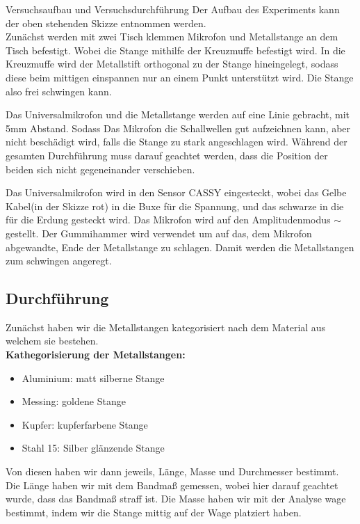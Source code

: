 \documentclass[twoside]{protokoll}
\begin{document}
\begin{aufgabe}{Versuchsaufbau und Versuchsdurchführung}
Der Aufbau des Experiments kann der oben stehenden Skizze entnommen werden. \\


Zunächst werden mit zwei Tisch klemmen Mikrofon und Metallstange an dem Tisch befestigt. Wobei die Stange mithilfe der Kreuzmuffe befestigt wird. In die Kreuzmuffe wird der Metallstift orthogonal zu der Stange hineingelegt, sodass diese beim mittigen einspannen nur an einem Punkt unterstützt wird. Die Stange also frei schwingen kann. 

Das Universalmikrofon und die Metallstange werden auf eine Linie gebracht, mit 5mm Abstand. Sodass Das Mikrofon die Schallwellen gut aufzeichnen kann, aber nicht beschädigt wird, falls die Stange zu stark angeschlagen wird. Während der gesamten Durchführung muss darauf geachtet werden, dass die Position der beiden sich nicht gegeneinander verschieben. 


Das Universalmikrofon wird in den Sensor CASSY eingesteckt, wobei das Gelbe Kabel(in der Skizze rot) in die Buxe für die Spannung, und das schwarze in die für die Erdung gesteckt wird. Das Mikrofon wird auf den Amplitudenmodus $\sim$ gestellt. Der Gummihammer wird verwendet um auf das, dem Mikrofon abgewandte, Ende der Metallstange zu schlagen. Damit werden die Metallstangen zum schwingen angeregt.

\subsection{Durchführung}

Zunächst haben wir die Metallstangen kategorisiert nach dem Material aus welchem sie bestehen.\\

\textbf{Kathegorisierung der Metallstangen:}

\begin{itemize}
\item Aluminium:		 matt silberne Stange 
\item Messing:		 goldene Stange
\item Kupfer:			 kupferfarbene Stange
\item Stahl 15:		 Silber glänzende Stange
\end{itemize}

Von diesen haben wir dann jeweils, Länge, Masse und Durchmesser bestimmt. 
Die Länge haben wir mit dem Bandmaß gemessen, wobei hier darauf geachtet wurde, dass das Bandmaß straff ist. Die Masse haben wir mit der Analyse wage bestimmt, indem wir die Stange mittig auf der Wage platziert haben. 



\end{aufgabe}
\end{document}
